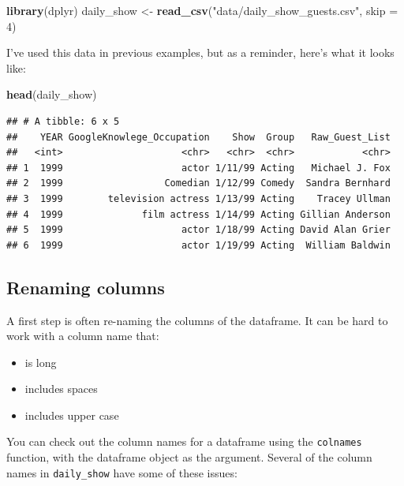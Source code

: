 \documentclass[]{book}
\makeatletter
\newenvironment{Shaded}{\begin{snugshade}}{\end{snugshade}}
\newcommand{\KeywordTok}[1]{\textcolor[rgb]{0.13,0.29,0.53}{\textbf{#1}}}
\newcommand{\DataTypeTok}[1]{\textcolor[rgb]{0.13,0.29,0.53}{#1}}
\newcommand{\DecValTok}[1]{\textcolor[rgb]{0.00,0.00,0.81}{#1}}
\newcommand{\StringTok}[1]{\textcolor[rgb]{0.31,0.60,0.02}{#1}}
\newcommand{\NormalTok}[1]{#1}
\providecommand{\tightlist}{%
  \setlength{\itemsep}{0pt}\setlength{\parskip}{0pt}}
\newenvironment{kframe}{%
\medskip{}
\setlength{\fboxsep}{.8em}
 \def\at@end@of@kframe{}%
 \ifinner\ifhmode%
  \def\at@end@of@kframe{\end{minipage}}%
  \begin{minipage}{\columnwidth}%
 \fi\fi%
 \def\FrameCommand##1{\hskip\@totalleftmargin \hskip-\fboxsep
 \colorbox{shadecolor}{##1}\hskip-\fboxsep
     \hskip-\linewidth \hskip-\@totalleftmargin \hskip\columnwidth}%
 \MakeFramed {\advance\hsize-\width
   \@totalleftmargin\z@ \linewidth\hsize
   \@setminipage}}%
 {\par\unskip\endMakeFramed%
 \at@end@of@kframe}
\renewenvironment{Shaded}{\begin{kframe}}{\end{kframe}}
\theoremstyle{definition}
\theoremstyle{definition}
\theoremstyle{definition}
\theoremstyle{remark}
\makeatother
\begin{document}
\begin{Shaded}
\begin{Highlighting}[]
\KeywordTok{library}\NormalTok{(dplyr)}
\NormalTok{daily_show <-}\StringTok{ }\KeywordTok{read_csv}\NormalTok{(}\StringTok{"data/daily_show_guests.csv"}\NormalTok{, }\DataTypeTok{skip =} \DecValTok{4}\NormalTok{)}
\end{Highlighting}
\end{Shaded}

I've used this data in previous examples, but as a reminder, here's what
it looks like:

\begin{Shaded}
\begin{Highlighting}[]
\KeywordTok{head}\NormalTok{(daily_show)}
\end{Highlighting}
\end{Shaded}

\begin{verbatim}
## # A tibble: 6 x 5
##    YEAR GoogleKnowlege_Occupation    Show  Group   Raw_Guest_List
##   <int>                     <chr>   <chr>  <chr>            <chr>
## 1  1999                     actor 1/11/99 Acting   Michael J. Fox
## 2  1999                  Comedian 1/12/99 Comedy  Sandra Bernhard
## 3  1999        television actress 1/13/99 Acting    Tracey Ullman
## 4  1999              film actress 1/14/99 Acting Gillian Anderson
## 5  1999                     actor 1/18/99 Acting David Alan Grier
## 6  1999                     actor 1/19/99 Acting  William Baldwin
\end{verbatim}

\subsection{Renaming columns}\label{renaming-columns}

A first step is often re-naming the columns of the dataframe. It can be
hard to work with a column name that:

\begin{itemize}
\tightlist
\item
  is long
\item
  includes spaces
\item
  includes upper case
\end{itemize}

You can check out the column names for a dataframe using the
\texttt{colnames} function, with the dataframe object as the argument.
Several of the column names in \texttt{daily\_show} have some of these
issues:
\end{document}
